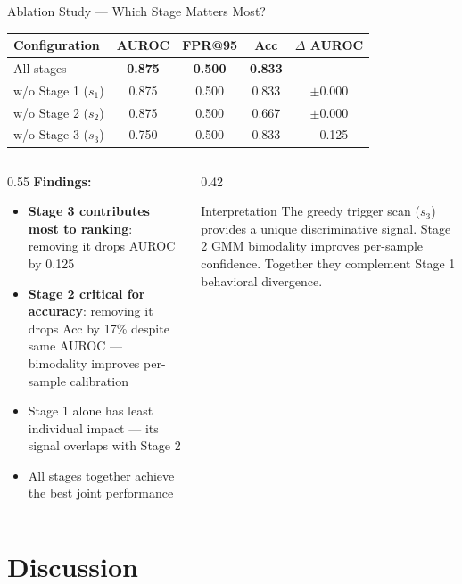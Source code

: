 \documentclass[aspectratio=169]{beamer}
\newcommand{\highlight}[1]{\textcolor{accentblue}{\textbf{#1}}}
\begin{document}
\begin{frame}{Ablation Study --- Which Stage Matters Most?}
\begin{center}
\begin{tabular}{lcccc}
\toprule
\textbf{Configuration} & \textbf{AUROC} & \textbf{FPR@95} & \textbf{Acc} & $\Delta$ AUROC \\
\midrule
All stages & \textbf{0.875} & \textbf{0.500} & \textbf{0.833} & --- \\
\midrule
w/o Stage 1 ($s_1$) & 0.875 & 0.500 & 0.833 & $\pm$0.000 \\
w/o Stage 2 ($s_2$) & 0.875 & 0.500 & 0.667 & $\pm$0.000 \\
w/o Stage 3 ($s_3$) & 0.750 & 0.500 & 0.833 & $-$0.125   \\
\bottomrule
\end{tabular}
\end{center}
\vspace{0.3em}
\begin{columns}
\begin{column}{0.55\textwidth}
  \textbf{Findings:}
  \begin{itemize}
    \item \highlight{Stage 3 contributes most to ranking}: removing it drops AUROC by 0.125
    \item \highlight{Stage 2 critical for accuracy}: removing it drops Acc by 17\% despite same AUROC --- bimodality improves per-sample calibration
    \item Stage 1 alone has least individual impact --- its signal overlaps with Stage 2
    \item All stages together achieve the best joint performance
  \end{itemize}
\end{column}
\begin{column}{0.42\textwidth}
  \begin{block}{Interpretation}
    The greedy trigger scan ($s_3$) provides a unique discriminative signal. Stage 2 GMM bimodality improves per-sample confidence. Together they complement Stage 1 behavioral divergence.
  \end{block}
\end{column}
\end{columns}
\end{frame}

\section{Discussion}
\end{document}
